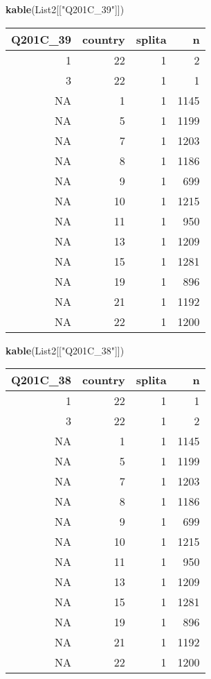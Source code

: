 \documentclass[]{article}
\newenvironment{Shaded}{\begin{snugshade}}{\end{snugshade}}
\newcommand{\KeywordTok}[1]{\textcolor[rgb]{0.13,0.29,0.53}{\textbf{#1}}}
\newcommand{\NormalTok}[1]{#1}
\newcommand{\StringTok}[1]{\textcolor[rgb]{0.31,0.60,0.02}{#1}}
\begin{document}
\begin{Shaded}
\begin{Highlighting}[]
\KeywordTok{kable}\NormalTok{(List2[[}\StringTok{"Q201C_39"}\NormalTok{]])}
\end{Highlighting}
\end{Shaded}

\begin{tabular}{r|r|r|r}
\hline
Q201C\_39 & country & splita & n\\
\hline
1 & 22 & 1 & 2\\
\hline
3 & 22 & 1 & 1\\
\hline
NA & 1 & 1 & 1145\\
\hline
NA & 5 & 1 & 1199\\
\hline
NA & 7 & 1 & 1203\\
\hline
NA & 8 & 1 & 1186\\
\hline
NA & 9 & 1 & 699\\
\hline
NA & 10 & 1 & 1215\\
\hline
NA & 11 & 1 & 950\\
\hline
NA & 13 & 1 & 1209\\
\hline
NA & 15 & 1 & 1281\\
\hline
NA & 19 & 1 & 896\\
\hline
NA & 21 & 1 & 1192\\
\hline
NA & 22 & 1 & 1200\\
\hline
\end{tabular}

\begin{Shaded}
\begin{Highlighting}[]
\KeywordTok{kable}\NormalTok{(List2[[}\StringTok{"Q201C_38"}\NormalTok{]])}
\end{Highlighting}
\end{Shaded}

\begin{tabular}{r|r|r|r}
\hline
Q201C\_38 & country & splita & n\\
\hline
1 & 22 & 1 & 1\\
\hline
3 & 22 & 1 & 2\\
\hline
NA & 1 & 1 & 1145\\
\hline
NA & 5 & 1 & 1199\\
\hline
NA & 7 & 1 & 1203\\
\hline
NA & 8 & 1 & 1186\\
\hline
NA & 9 & 1 & 699\\
\hline
NA & 10 & 1 & 1215\\
\hline
NA & 11 & 1 & 950\\
\hline
NA & 13 & 1 & 1209\\
\hline
NA & 15 & 1 & 1281\\
\hline
NA & 19 & 1 & 896\\
\hline
NA & 21 & 1 & 1192\\
\hline
NA & 22 & 1 & 1200\\
\hline
\end{tabular}
\end{document}
